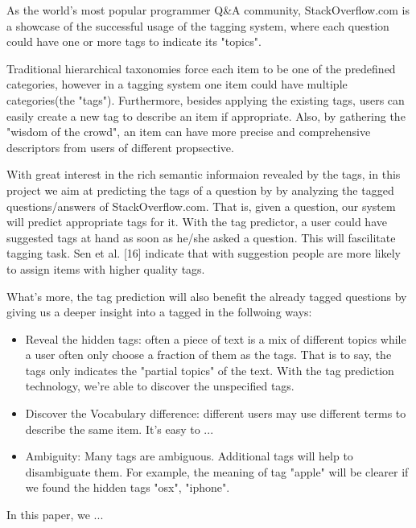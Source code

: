 
As the world's most popular programmer Q\&A community, StackOverflow.com is a showcase of the successful usage of the tagging system, where each question could have one or more tags to indicate its "topics". 

Traditional hierarchical taxonomies force each item to be one of the predefined categories, however in a tagging system one item could have multiple categories(the "tags"). Furthermore, besides applying the existing tags, users can easily create a new tag to describe an item if appropriate. Also, by gathering the "wisdom of the crowd", an item can have more precise and comprehensive descriptors from users of different propsective. 

With great interest in the rich semantic informaion revealed by the tags, in this project we aim at predicting the tags of a question by 
by analyzing the tagged questions/answers of StackOverflow.com. That is, given a question, our system will predict appropriate tags for it. With the tag predictor, a user could have suggested tags at hand as soon as he/she asked a question. This will fascilitate tagging task. Sen et al. [16] indicate that with suggestion people are more likely to assign items with higher quality tags.

What's more, the tag prediction will also benefit the already tagged questions by giving us a deeper insight into a tagged in the follwoing ways:

\begin{itemize}
    \item Reveal the hidden tags: often a piece of text is a mix of different topics while a user often only choose a fraction of them as the tags. That is to say, the tags only indicates the "partial topics" of the text. With the tag prediction technology, we're able to discover the unspecified tags.
    \item Discover the Vocabulary difference: different users may use different terms to describe the same item. It's easy to ...
    \item Ambiguity: Many tags are ambiguous. Additional tags will help to disambiguate them. For example, the meaning of tag "apple" will be clearer if we found the hidden tags "osx", "iphone".
\end{itemize}

In this paper, we ...
